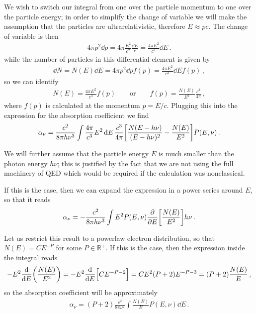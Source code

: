 \documentclass[main.tex]{subfiles}
\begin{document}
We wish to switch our integral from one over the particle momentum to one over the particle energy; in order to simplify the change of variable we will make the assumption that the particles are ultrarelativistic, therefore \(E \approx p c\). The change of variable is then 
%
\begin{align}
4 \pi p^2 \dd{p}=  4 \pi \frac{E^2}{c^2} \frac{\dd{E}}{c} = \frac{4 \pi E^2}{c^3} \dd{E}
\,.
\end{align}
%
while the number of particles in this differential element is given by 
%
\begin{align}
\dd{N} = N(E) \dd{E} = 4 \pi p^2 \dd{p} f(p) = \frac{4 \pi E^2}{c^3} \dd{E} f(p)
\,,
\end{align}
%
so we can identify 
%
\begin{align}
N(E) = \frac{4 \pi E^2}{c^3} f(p)
\qquad \text{or} \qquad
f(p) = \frac{N(E)}{E^2} \frac{c^3}{4 \pi }
\,,
\end{align}
%
where \(f(p)\) is calculated at the momentum \(p = E /c\).  
Plugging this into the expression for the absorption coefficient we find 
%
\begin{align}
\alpha _\nu = \frac{c^2}{8 \pi h \nu^3} \int \frac{4 \pi }{c^3} E^2 \dd{E} \frac{c^3}{4 \pi } \qty[\frac{N(E - h \nu )}{(E - h \nu )^2} - \frac{N(E)}{E^2}] P (E, \nu )
\,.
\end{align}

We will further assume that the particle energy \(E\) is much smaller than the photon energy \(h \nu \); this is justified by the fact that we are not using the full machinery of QED which would be required if the calculation was nonclassical. 


If this is the case, then we can expand the expression in a power series around \(E\), so that it reads 
%
\begin{align}
\alpha _\nu  = - \frac{c^2}{8 \pi h \nu^3} \int E^2 P(E, \nu ) \pdv{}{E} \qty[ \frac{N(E)}{E^2}] h \nu 
\,.
\end{align}

Let us restrict this result to a powerlaw electron distribution, so that \(N(E) = C E^{-P}\) for some \(P \in \mathbb{R}^{+}\). 
If this is the case, then the expression inside the integral reads 
%
\begin{align}
- E^2 \dv{}{E} \qty(\frac{N(E)}{E^2})
= - E^2 \dv{}{E} \qty[C E^{-P-2}]
= C E^2 (P+2) E^{-P-3} = (P+2) \frac{N(E)}{E}
\,,
\end{align}
%
so the absorption coefficient will be approximately 
%
\begin{align}
\alpha _\nu = (P+2) \frac{c^2}{8 \pi \nu^2} \int \frac{N(E)}{E} P(E, \nu ) \dd{E} 
\,.
\end{align}
\end{document}
